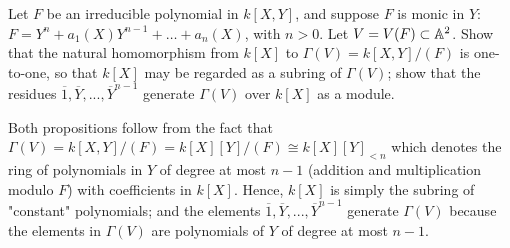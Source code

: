 \begin{exercise}
    Let $F$ be an irreducible polynomial in $k[X,Y]$, and suppose $F$ is monic in $Y$: $F = Y^n + a_1(X)Y^{n-1} +\dots + a_n(X)$, with $n > 0$. Let $V = V(F) \subset \mathbb{A}^2$. Show that the natural homomorphism from $k[X]$ to $\Gamma(V) = k[X,Y]/(F)$ is one-to-one, so that $k[X]$ may be regarded as a subring of $\Gamma(V)$; show that the residues $\overline{1}, \overline{Y}, ..., \overline{Y}^{n-1}$ generate $\Gamma(V)$ over $k[X]$ as a module. \\
\end{exercise}

\begin{solution}
    Both propositions follow from the fact that $\Gamma(V) = k[X,Y]/(F) = k[X][Y]/(F) \cong k[X][Y]_{< n}$ which denotes the ring of polynomials in $Y$ of degree at most $n-1$ (addition and multiplication modulo $F$) with coefficients in $k[X]$. Hence, $k[X]$ is simply the subring of "constant" polynomials; and the elements $\overline{1}, \overline{Y}, ..., \overline{Y}^{n-1}$ generate $\Gamma(V)$ because the elements in $\Gamma(V)$ are polynomials of $Y$ of degree at most $n-1$.
\end{solution}